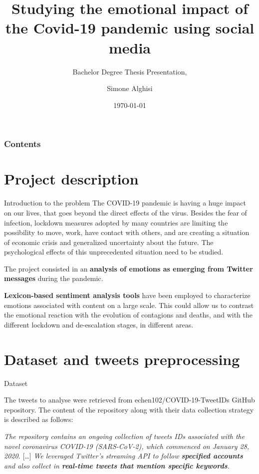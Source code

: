 \documentclass[8pt]{beamer}  %
\title{Studying the emotional impact of the Covid-19 pandemic using social media}
\subtitle{Bachelor Degree Thesis Presentation, \textattachfile{Template.tex}{(TeX)}} %
\author{Simone Alghisi}
\institute{Università degli Studi di Trento}
\date[\today]{\today}
\begin{document}
\frame{\titlepage} %

\setcounter{tocdepth}{1}

\begin{frame}
    \frametitle{Contents}
    \tableofcontents
\end{frame}

\setlength{\abovedisplayskip}{0pt}
\setlength{\belowdisplayskip}{0pt}
\setlength{\abovedisplayshortskip}{0pt}
\setlength{\belowdisplayshortskip}{0pt}  %

\section{Project description}
\begin{frame}{Introduction to the problem}
The COVID-19 pandemic is having a huge impact on our lives, that goes beyond the direct effects of the virus. Besides the fear of infection, lockdown measures adopted by many countries are limiting the possibility to move, work, have contact with others, and are creating a situation of economic crisis and generalized uncertainty about the future. The psychological effects of this unprecedented situation need to be studied.

The project consisted in an \textbf{analysis of emotions as emerging from Twitter messages} during the pandemic.

\textbf{Lexicon-based sentiment analysis tools} have been employed to characterize emotions associated with content on a large scale. This could allow us to contrast the emotional reaction with the evolution of contagions and deaths, and
with the different lockdown and de-escalation stages, in different areas.

\end{frame}

\section{Dataset and tweets preprocessing}

\begin{frame}{Dataset}

	The tweets to analyse were retrieved from echen102/COVID-19-TweetIDs GitHub repository\autocite{chen2020tracking}. The content of the repository along with their data collection strategy is described as follows:
	
	\textit{The repository contains an ongoing collection of tweets IDs associated with the novel coronavirus COVID-19 (SARS-CoV-2), which commenced on January 28, 2020.} [\ldots] 
	\textit{We leveraged Twitter’s streaming API to follow \textbf{specified accounts} and also collect in \textbf{real-time tweets that mention specific keywords}.}

\end{frame}
\end{document}
